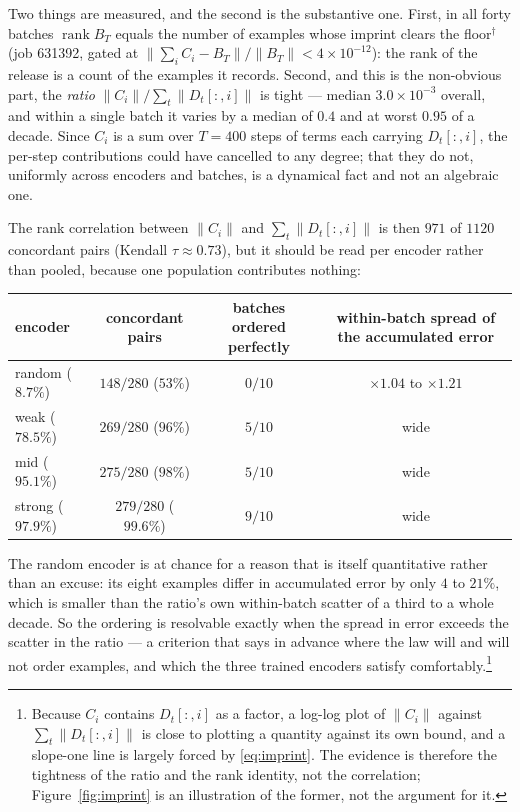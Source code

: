 Two things are measured, and the second is the substantive one. First, in
all forty batches $\operatorname{rank}B_T$ equals the number of examples
whose imprint clears the floor$^\dagger$ (job 631392, gated at
$\|\sum_iC_i-B_T\|/\|B_T\|<4\times10^{-12}$): the rank of the release is a
count of the examples it records. Second, and this is the non-obvious part,
the \emph{ratio} $\|C_i\|/\sum_t\|D_t[:,i]\|$ is tight — median
$3.0\times10^{-3}$ overall, and within a single batch it varies by a median
of $0.4$ and at worst $0.95$ of a decade. Since $C_i$ is a sum over $T=400$
steps of terms each carrying $D_t[:,i]$, the per-step contributions could
have cancelled to any degree; that they do not, uniformly across encoders
and batches, is a dynamical fact and not an algebraic one.

The rank correlation between $\|C_i\|$ and $\sum_t\|D_t[:,i]\|$ is then
$971$ of $1120$ concordant pairs (Kendall $\tau\approx0.73$), but it should
be read per encoder rather than pooled,
because one population contributes nothing:
\begin{center}\small
\begin{tabular}{@{}lccc@{}}\toprule
encoder & concordant pairs & batches ordered perfectly & within-batch spread of the accumulated error\\ \midrule
random ($8.7\%$) & $148/280$ ($53\%$) & $0/10$ & $\times1.04$ to $\times1.21$\\
weak ($78.5\%$) & $269/280$ ($96\%$) & $5/10$ & wide\\
mid ($95.1\%$) & $275/280$ ($98\%$) & $5/10$ & wide\\
strong ($97.9\%$) & $279/280$ ($99.6\%$) & $9/10$ & wide\\ \bottomrule
\end{tabular}
\end{center}
The random encoder is at chance for a reason that is itself quantitative
rather than an excuse: its eight examples differ in accumulated error by
only $4$ to $21\%$, which is smaller than the ratio's own within-batch
scatter of a third to a whole decade. So the ordering is resolvable exactly
when the spread in error exceeds the scatter in the ratio — a criterion that
says in advance where the law will and will not order examples, and which
the three trained encoders satisfy comfortably.\footnote{Because $C_i$
contains $D_t[:,i]$ as a factor, a log-log plot of $\|C_i\|$ against
$\sum_t\|D_t[:,i]\|$ is close to plotting a quantity against its own bound,
and a slope-one line is largely forced by \eqref{eq:imprint}. The evidence
is therefore the tightness of the ratio and the rank identity, not the
correlation; Figure~\ref{fig:imprint} is an illustration of the former, not
the argument for it.}

